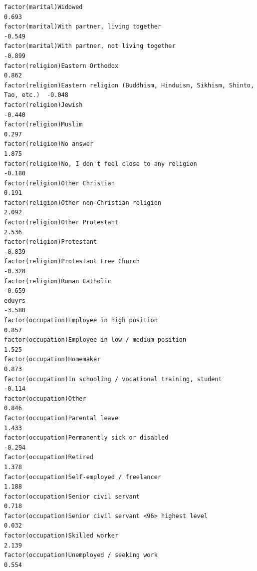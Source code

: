 \documentclass[
]{article}
\begin{document}
\begin{table}
\begin{minipage}[t]{\linewidth}
{\begin{verbatim}
factor(marital)Widowed                                                              0.693
factor(marital)With partner, living together                                       -0.549
factor(marital)With partner, not living together                                   -0.899
factor(religion)Eastern Orthodox                                                    0.862
factor(religion)Eastern religion (Buddhism, Hinduism, Sikhism, Shinto, Tao, etc.)  -0.048
factor(religion)Jewish                                                             -0.440
factor(religion)Muslim                                                              0.297
factor(religion)No answer                                                           1.875
factor(religion)No, I don't feel close to any religion                             -0.180
factor(religion)Other Christian                                                     0.191
factor(religion)Other non-Christian religion                                        2.092
factor(religion)Other Protestant                                                    2.536
factor(religion)Protestant                                                         -0.839
factor(religion)Protestant Free Church                                             -0.320
factor(religion)Roman Catholic                                                     -0.659
eduyrs                                                                             -3.580
factor(occupation)Employee in high position                                         0.857
factor(occupation)Employee in low / medium position                                 1.525
factor(occupation)Homemaker                                                         0.873
factor(occupation)In schooling / vocational training, student                      -0.114
factor(occupation)Other                                                             0.846
factor(occupation)Parental leave                                                    1.433
factor(occupation)Permanently sick or disabled                                     -0.294
factor(occupation)Retired                                                           1.378
factor(occupation)Self-employed / freelancer                                        1.188
factor(occupation)Senior civil servant                                              0.718
factor(occupation)Senior civil servant <96> highest level                           0.032
factor(occupation)Skilled worker                                                    2.139
factor(occupation)Unemployed / seeking work                                         0.554

\end{verbatim}}
\end{minipage}
\end{table}
\end{document}
